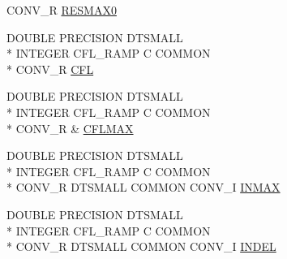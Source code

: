 \begin{DoxyCompactItemize}
C\-O\-N\-V\-\_\-\-R \hyperlink{msa20_2home_2abonfi_2_c_f_d__codes_2_eul_f_s_83_82_83_2include_2conv_8com_a6783bad88b4fdda9cf12e1788ad0a190}{R\-E\-S\-M\-A\-X0}
\item 
D\-O\-U\-B\-L\-E P\-R\-E\-C\-I\-S\-I\-O\-N D\-T\-S\-M\-A\-L\-L \\*
I\-N\-T\-E\-G\-E\-R C\-F\-L\-\_\-\-R\-A\-M\-P C C\-O\-M\-M\-O\-N \\*
C\-O\-N\-V\-\_\-\-R \hyperlink{msa20_2home_2abonfi_2_c_f_d__codes_2_eul_f_s_83_82_83_2include_2conv_8com_abba4cd7448a713602f433783798bc49f}{C\-F\-L}
\item 
D\-O\-U\-B\-L\-E P\-R\-E\-C\-I\-S\-I\-O\-N D\-T\-S\-M\-A\-L\-L \\*
I\-N\-T\-E\-G\-E\-R C\-F\-L\-\_\-\-R\-A\-M\-P C C\-O\-M\-M\-O\-N \\*
C\-O\-N\-V\-\_\-\-R \& \hyperlink{msa20_2home_2abonfi_2_c_f_d__codes_2_eul_f_s_83_82_83_2include_2conv_8com_acefea3b10cf227cfbe18a5ae682cda07}{C\-F\-L\-M\-A\-X}
\item 
D\-O\-U\-B\-L\-E P\-R\-E\-C\-I\-S\-I\-O\-N D\-T\-S\-M\-A\-L\-L \\*
I\-N\-T\-E\-G\-E\-R C\-F\-L\-\_\-\-R\-A\-M\-P C C\-O\-M\-M\-O\-N \\*
C\-O\-N\-V\-\_\-\-R D\-T\-S\-M\-A\-L\-L C\-O\-M\-M\-O\-N C\-O\-N\-V\-\_\-\-I \hyperlink{msa20_2home_2abonfi_2_c_f_d__codes_2_eul_f_s_83_82_83_2include_2conv_8com_ae1a2f506c87687fe1a93649abac3846a}{I\-N\-M\-A\-X}
\item 
D\-O\-U\-B\-L\-E P\-R\-E\-C\-I\-S\-I\-O\-N D\-T\-S\-M\-A\-L\-L \\*
I\-N\-T\-E\-G\-E\-R C\-F\-L\-\_\-\-R\-A\-M\-P C C\-O\-M\-M\-O\-N \\*
C\-O\-N\-V\-\_\-\-R D\-T\-S\-M\-A\-L\-L C\-O\-M\-M\-O\-N C\-O\-N\-V\-\_\-\-I \hyperlink{msa20_2home_2abonfi_2_c_f_d__codes_2_eul_f_s_83_82_83_2include_2conv_8com_af687d75faa87ba22ebd22f23d1d75cf2}{I\-N\-D\-E\-L}
\end{DoxyCompactItemize}


